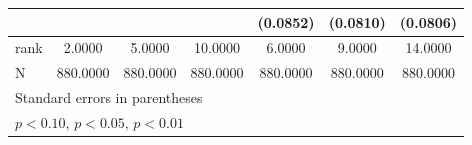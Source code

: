 {\begin{tabular}{l*{6}{c}}
                    &                     &                     &                     &    (0.0852)         &    (0.0810)         &    (0.0806)         \\
\midrule
rank                &      2.0000         &      5.0000         &     10.0000         &      6.0000         &      9.0000         &     14.0000         \\
N                   &    880.0000         &    880.0000         &    880.0000         &    880.0000         &    880.0000         &    880.0000         \\
\bottomrule
\multicolumn{7}{l}{\footnotesize Standard errors in parentheses}\\
\multicolumn{7}{l}{\footnotesize \sym{*} \(p<0.10\), \sym{**} \(p<0.05\), \sym{***} \(p<0.01\)}\\
\end{tabular}
}
